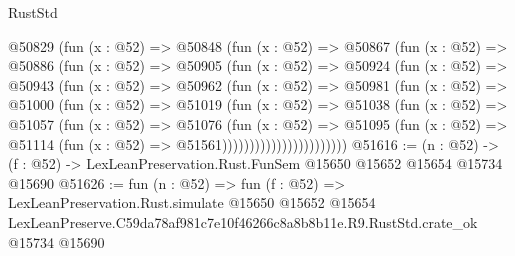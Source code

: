 \begin{lexlean}{RustStd}
\begin{coremodule}
                @50829
                  (fun (x : @52) =>
                  @50848
                    (fun (x : @52) =>
                    @50867
                      (fun (x : @52) =>
                      @50886
                        (fun (x : @52) =>
                        @50905
                          (fun (x : @52) =>
                          @50924
                            (fun (x : @52) =>
                            @50943
                              (fun (x : @52) =>
                              @50962
                                (fun (x : @52) =>
                                @50981
                                  (fun (x : @52) =>
                                  @51000
                                    (fun (x : @52) =>
                                    @51019
                                      (fun (x : @52) =>
                                      @51038
                                        (fun (x : @52) =>
                                        @51057
                                          (fun (x : @52) =>
                                          @51076
                                            (fun (x : @52) =>
                                            @51095
                                              (fun (x : @52) =>
                                              @51114 (fun (x : @52) => @51561)))))))))))))))))))))))
@51616 := (n : @52) ->
  (f : @52) -> LexLeanPreservation.Rust.FunSem @15650 @15652 @15654 @15734 @15690
@51626 := fun (n : @52) =>
  fun (f : @52) =>
  LexLeanPreservation.Rust.simulate
    @15650
    @15652
    @15654
    LexLeanPreserve.C59da78af981c7e10f46266c8a8b8b11e.R9.RustStd.crate_ok
    @15734
    @15690
\end{coremodule}
\end{lexlean}
